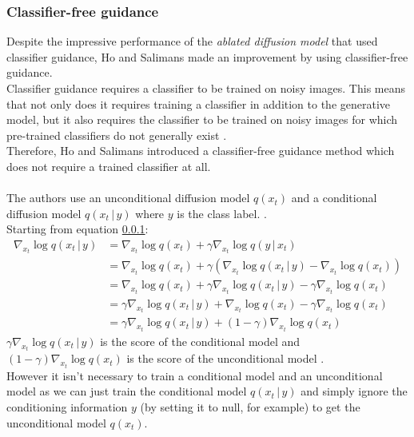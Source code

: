 \documentclass{article}
\begin{document}
\subsubsection{Classifier-free guidance}
Despite the impressive performance of the \textit{ablated diffusion model} that used classifier guidance, Ho and Salimans made an improvement by using classifier-free guidance. \cite{ho2022classifierfree} \\
Classifier guidance requires a classifier to be trained on noisy images. This means that not only does it requires training a classifier in addition to the generative model, but it also requires the classifier to be trained on noisy images for which pre-trained classifiers do not generally exist \cite{ho2022classifierfree}. \\
Therefore, Ho and Salimans \cite{ho2022classifierfree} introduced a classifier-free guidance method which does not require a trained classifier at all. 
\\\\
The authors use an unconditional diffusion model $q(x_t)$ and a conditional diffusion model $q(x_t \, | \, y)$ where $y$ is the class label. \cite{ho2022classifierfree, luo2022understanding}. \\
Starting from equation \ref{}:
\begin{align}
  \nabla_{x_t} \log q(x_t \, | \, y) &= \nabla_{x_t} \log q(x_t) + \gamma \nabla_{x_t} \log q(y \, | \, x_t) \\
  &= \nabla_{x_t} \log q(x_t) + \gamma \left( \nabla_{x_t} \log q (x_t \, | \, y) - \nabla_{x_t} \log q(x_t) \right) \\
  &= \nabla_{x_t} \log q(x_t) + \gamma \nabla_{x_t} \log q (x_t \, | \, y) - \gamma \nabla_{x_t} \log q(x_t) \\
  &= \gamma \nabla_{x_t} \log q (x_t \, | \, y) + \nabla_{x_t} \log q(x_t) - \gamma \nabla_{x_t} \log q(x_t) \\
  &= \gamma \nabla_{x_t} \log q (x_t \, | \, y) + (1 - \gamma) \nabla_{x_t} \log q(x_t)
\end{align}
$\gamma \nabla_{x_t} \log q (x_t \, | \, y)$ is the score of the conditional model and $(1 - \gamma) \nabla_{x_t} \log q(x_t)$ is the score of the unconditional model \cite{luo2022understanding}. \\
However it isn't necessary to train a conditional model and an unconditional model as we can just train the conditional model $q(x_t \, | \, y)$ and simply ignore the conditioning information $y$ (by setting it to null, for example) to get the unconditional model $q(x_t)$. \cite{ho2022classifierfree,luo2022understanding} \\
\newpage
\end{document}
